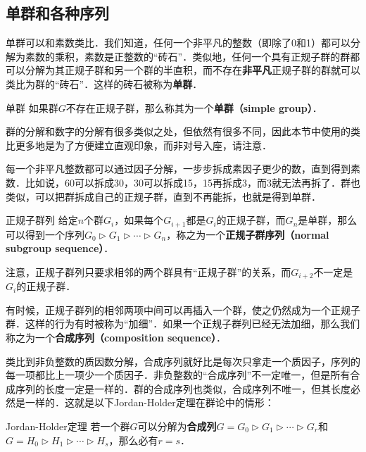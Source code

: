 

\subsection{单群和各种序列}

单群可以和素数类比．我们知道，任何一个非平凡的整数（即除了0和1）都可以分解为素数的乘积，素数是正整数的“砖石”．类似地，任何一个具有正规子群的群都可以分解为其正规子群和另一个群的半直积，而不存在\textbf{非平凡}正规子群的群就可以类比为群的“砖石”．这样的砖石被称为\textbf{单群}．

\begin{definition}{单群}
如果群$G$不存在正规子群，那么称其为一个\textbf{单群（simple group）}．
\end{definition}

群的分解和数字的分解有很多类似之处，但依然有很多不同，因此本节中使用的类比更多地是为了方便建立直观印象，而非对号入座，请注意．

每一个非平凡整数都可以通过因子分解，一步步拆成素因子更少的数，直到得到素数．比如说，60可以拆成30，30可以拆成15，15再拆成3，而3就无法再拆了．群也类似，可以把群拆成自己的正规子群，直到不再能拆，也就是得到单群．

\begin{definition}{正规子群列}
给定$n$个群$G_i$，如果每个$G_{i+1}$都是$G_{i}$的正规子群，而$G_n$是单群，那么可以得到一个序列$G_0\triangleright G_1\triangleright\cdots\triangleright G_n$，称之为一个\textbf{正规子群序列（normal subgroup sequence）}．
\end{definition}

注意，正规子群列只要求相邻的两个群具有“正规子群”的关系，而$G_{i+2}$不一定是$G_i$的正规子群．

有时候，正规子群列的相邻两项中间可以再插入一个群，使之仍然成为一个正规子群．这样的行为有时被称为“加细”．如果一个正规子群列已经无法加细，那么我们称之为一个\textbf{合成序列（composition sequence）}．

类比到非负整数的质因数分解，合成序列就好比是每次只拿走一个质因子，序列的每一项都比上一项少一个质因子．非负整数的“合成序列”不一定唯一，但是所有合成序列的长度一定是一样的．群的合成序列也类似，合成序列不唯一，但其长度必然是一样的．这就是以下Jordan-Holder定理在群论中的情形：

\begin{definition}{Jordan-Holder定理}
若一个群$G$可以分解为\textbf{合成列}$G=G_0\triangleright G_1\triangleright\cdots\triangleright G_r$和$G=H_0\triangleright H_1\triangleright\cdots\triangleright H_s$，那么必有$r=s$．
\end{definition}

